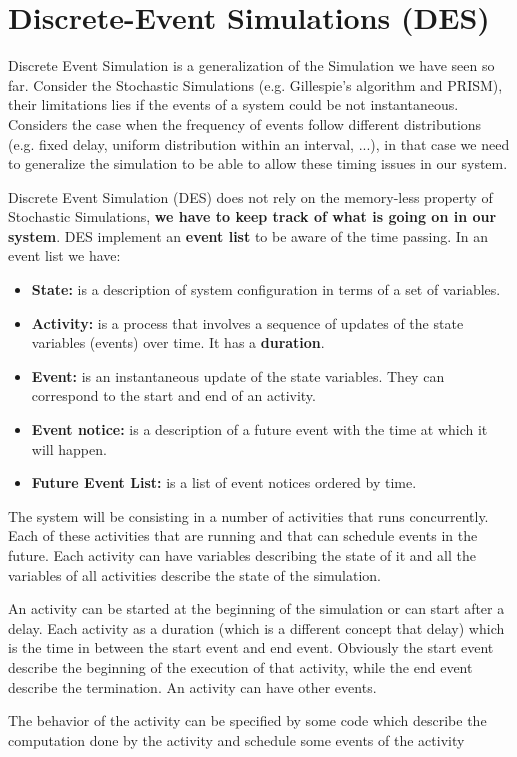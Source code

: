 \chapter{Discrete-Event Simulations (DES)}

Discrete Event Simulation is a generalization of the Simulation we have seen so far. Consider the Stochastic Simulations (e.g. Gillespie's algorithm and PRISM), their limitations lies if the events of a system could be not instantaneous. Considers the case when the frequency of events follow different distributions (e.g. fixed delay, uniform distribution within an interval, ...), in that case we need to generalize the simulation to be able to allow these timing issues in our system. \par

Discrete Event Simulation (DES) does not rely on the memory-less property of Stochastic Simulations, \textbf{we have to keep track of what is going on in our system}. DES implement an \textbf{event list} to be aware of the time passing. In an event list we have:

\begin{itemize}
    \item \textbf{State:} is a description of system configuration in terms of a set of variables.
    \item \textbf{Activity:} is a process that involves a sequence of updates of the state variables (events) over time. It has a \textbf{duration}.
    \item \textbf{Event:} is an instantaneous update of the state variables. They can correspond to the start and end of an activity.
    \item \textbf{Event notice:} is a description of a future event with the time at which it will happen.
    \item \textbf{Future Event List:} is a list of event notices ordered by time.
\end{itemize}

The system will be consisting in a number of activities that runs concurrently. Each of these activities that are running and that can schedule events in the future. Each activity can have variables describing the state of it and all the variables of all activities describe the state of the simulation.\par
An activity can be started at the beginning of the simulation or can start after a delay. Each activity as a duration (which is a different concept that delay) which is the time in between the start event and end event. Obviously the start event describe the beginning of the execution of that activity, while the end event describe the termination. An activity can have other events.\par
The behavior of the activity can be specified by some code which describe the computation done by the activity and schedule some events of the activity

